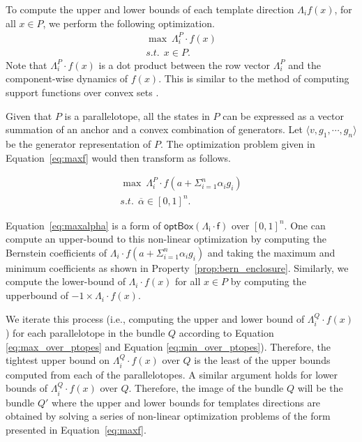 %
%
%
%
To compute the upper and lower bounds of each template direction $\Lambda_{i} f(x)$, for all $x \in P$, we perform the following optimization.
%
\begin{eqnarray}
  \max ~ \Lambda_i^{P} \cdot f(x) \label{eq:maxf}\\
  s.t. ~~ x \in P.\nonumber
\end{eqnarray}
%
\noindent Note that $\Lambda_i^{P} \cdot f(x)$ is a dot product between the row vector $\Lambda_i^{P}$ and the component-wise dynamics of $f(x)$. This is similar to the method of computing support functions over convex sets \cite{boyd2004convex}.


Given that $P$ is a parallelotope, all the states in $P$ can be expressed as a vector summation of an anchor and a convex combination of generators.
%
Let  $\langle v, g_1, \cdots, g_n \rangle$ be the generator representation of $P$.
%
The optimization problem given in Equation~\ref{eq:maxf} would then transform as follows.

\begin{eqnarray}
  \max ~ \Lambda_i^P \cdot f(a + \Sigma_{i=1}^{n} \alpha_i g_i) \label{eq:maxalpha}\\
  s.t. ~~ \overline\alpha \in [0,1]^{n}.\nonumber
\end{eqnarray}

Equation~\ref{eq:maxalpha} is a form of $\mathsf{optBox(\Lambda_{i} \cdot f)}$ over $[0,1]^n$.
%
One can compute an upper-bound to this non-linear optimization by computing the Bernstein coefficients of $\Lambda_i \cdot f(a + \Sigma_{i=1}^{n} \alpha_i g_i)$ and taking the maximum and minimum coefficients as shown in Property~\ref{prop:bern_enclosure}.
%
Similarly, we compute the lower-bound of $\Lambda_{i}\cdot f(x)$ for all $x \in P$ by computing the upperbound of $-1 \times \Lambda_{i}\cdot f(x)$.
%

We iterate this process (i.e., computing the upper and lower bound of $\Lambda^Q_{i}\cdot f(x)$) for each parallelotope in the bundle $Q$ according to Equation \ref{eq:max_over_ptopes} and Equation \ref{eq:min_over_ptopes}).
%
%
Therefore, the tightest upper bound on $\Lambda^Q_{i}\cdot f(x)$ over $Q$ is the least of the upper bounds computed from each of the parallelotopes.
%
A similar argument holds for lower bounds of $\Lambda^Q_{i}\cdot f(x)$ over $Q$.
%
Therefore, the image of the bundle $Q$ will be the bundle $Q'$ where the upper and lower bounds for templates directions are obtained by solving a series of non-linear optimization problems of the form presented in Equation~\ref{eq:maxf}.

